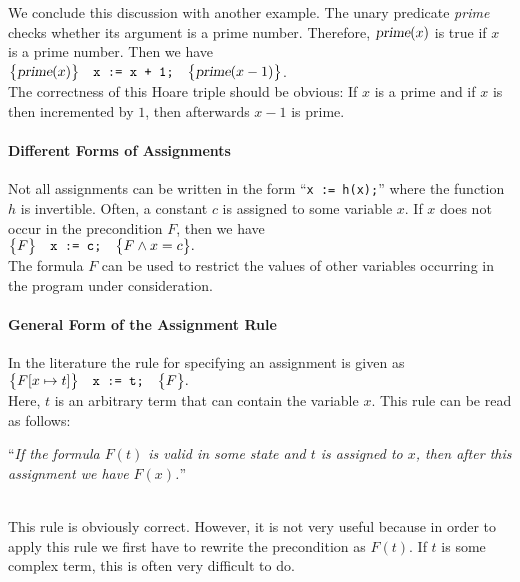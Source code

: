 We conclude this discussion with another example.  The unary predicate \textsl{prime} checks whether
its argument is a prime number.  Therefore, $\textsl{prime}(x)$ is true if $x$ is a prime number.
Then we have
\\[0.2cm]
\hspace*{1.3cm}
$\bigl\{\textsl{prime}(x)\bigr\}\quad\texttt{x := x + 1;}\quad\bigl\{\textsl{prime}(x-1)\bigr\}$.
\\[0.2cm]
The correctness of this Hoare triple should be obvious: If $x$ is a prime and if $x$ is then
incremented by $1$, then afterwards $x-1$ is prime.

\paragraph{Different Forms of Assignments}
Not all assignments can be written in the form ``\texttt{x := h(x);}'' where the function $h$ is invertible.
Often, a constant $c$ is assigned to some variable $x$.  If $x$ does not occur in the precondition
$F$, then we have
\\[0.2cm]
\hspace*{1.3cm}
$ \bigl\{F\bigr\}\quad\texttt{x := c;}\quad\bigl\{F \wedge x = c\bigr\}. $
\\[0.2cm]
The formula $F$ can be used to restrict the values of other variables occurring in the program under
consideration.


\paragraph{General Form of the Assignment Rule}
In the literature the rule for specifying an assignment is given as
\\[0.2cm]
\hspace*{1.3cm}
$ \bigl\{F[x \mapsto t]\bigr\}\quad\texttt{x := t;}\quad\bigl\{F\bigr\}. $
\\[0.2cm]
Here, $t$ is an arbitrary term that can contain the variable $x$.  This rule can be read as follows:
\\[0.2cm]
\hspace*{1.3cm}
\begin{minipage}[c]{0.8\linewidth}
``\emph{If the formula $F(t)$ is valid in some state and $t$ is assigned to $x$,
        then after this assignment we have $F(x)$.}'' 
\end{minipage}
\\[0.2cm]
This rule is obviously correct.  However, it is not very useful because in order to apply this rule 
we first have to rewrite the precondition as $F(t)$.  If $t$ is some complex term, this is often
very difficult to do.


